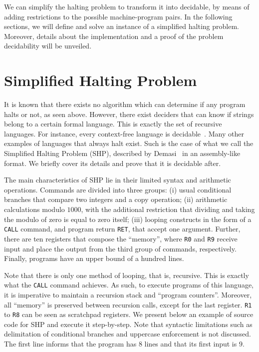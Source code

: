 \documentclass[12pt]{article}
\begin{document}
We can simplify the halting problem to transform it into decidable, by means of adding restrictions to the possible machine-program pairs. In the following sections, we will define and solve an instance of a simplified halting problem. Moreover, details about the implementation and a proof of the problem decidability will be unveiled.

\section{Simplified Halting Problem}\label{sec:halting}

It is known that there exists no algorithm which can determine if any program halts or not, as seen above. However, there exist deciders that can know if strings belong to a certain formal language. This is exactly the set of recursive languages. For instance, every context-free language is decidable~\cite[Theorem 4.9]{Sipser:book:2012}. Many other examples of languages that always halt exist. Such is the case of what we call the Simplified Halting Problem (SHP), described by Demasi~\cite{Demasi:misc:2013:may} in an assembly-like format. We briefly cover its details and prove that it is decidable after.

The main characteristics of SHP lie in their limited syntax and arithmetic operations. Commands are divided into three groups: (i) usual conditional branches that compare two integers and a copy operation; (ii) arithmetic calculations modulo $1000$, with the additional restriction that dividing and taking the modulo of zero is equal to zero itself; (iii) looping constructs in the form of a \texttt{CALL} command, and program return \texttt{RET}, that accept one argument. Further, there are ten registers that compose the ``memory'', where \texttt{R0} and \texttt{R9} receive input and place the output from the third group of commands, respectively. Finally, programs have an upper bound of a hundred lines.

Note that there is only one method of looping, that is, recursive. This is exactly what the \texttt{CALL} command achieves. As such, to execute programs of this language, it is imperative to maintain a recursion stack and ``program counters''. Moreover, all ``memory'' is preserved between recursion calls, except for the last register. \texttt{R1} to \texttt{R8} can be seen as scratchpad registers. We present below an example of source code for SHP and execute it step-by-step. Note that syntactic limitations such as delimitation of conditional branches and uppercase enforcement is not discussed. The first line informs that the program has $8$ lines and that its first input is $9$.
\end{document}

